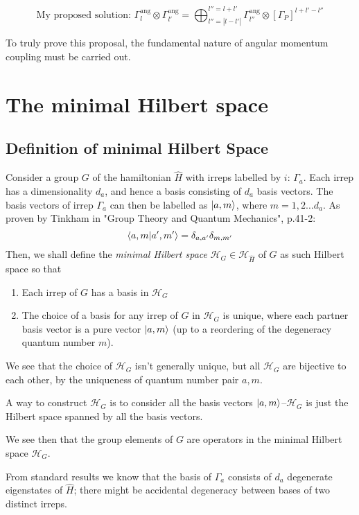 \documentclass[12pt]{article}
\begin{document}
	$$\text{My proposed solution: }\Gamma^\text{ang}_{l}\otimes \Gamma^\text{ang}_{l'} = \bigoplus_{l''=|l-l'|}^{l''=l+l'} \Gamma^\text{ang}_{l''} \otimes \left[\Gamma_P\right]^{l+l'-l''}$$
	
	To truly prove this proposal, the fundamental nature of angular momentum coupling must be carried out.
	
	\section{The minimal Hilbert space}
	
	\subsection{Definition of minimal Hilbert Space}
	
	Consider a group $G$ of the hamiltonian $\hat{H}$ with irreps labelled by $i$: $\Gamma_a$. Each irrep has a dimensionality $d_a$, and hence a basis consisting of $d_a$ basis vectors. The basis vectors of irrep $\Gamma_a$ can then be labelled as $\ket{a,m}$, where $m=1,2\dots d_a$. As proven by Tinkham in "Group Theory and Quantum Mechanics", p.41-2:
	$$\braket{a,m}{a',m'}=\delta_{a,a'}\delta_{m,m'}$$
	Then, we shall define the \textit{minimal Hilbert space} $\mathcal{H}_G\in\mathcal{H}_{\hat{H}}$ of $G$ as such Hilbert space so that
	\begin{enumerate}
	\item Each irrep of $G$ has a basis in $\mathcal{H}_G$
	\item The choice of a basis for any irrep of $G$ in $\mathcal{H}_G$ is unique, where each partner basis vector is a pure vector $\ket{a,m}$ (up to a reordering of the degeneracy quantum number $m$).
	\end{enumerate}
	We see that the choice of $\mathcal{H}_G$ isn't generally unique, but all $\mathcal{H}_G$ are bijective to each other, by the uniqueness of quantum number pair $a,m$.
	
	A way to construct $\mathcal{H}_G$ is to consider all the basis vectors $\ket{a,m}$--$\mathcal{H}_G$ is just the Hilbert space spanned by all the basis vectors.
	
	We see then that the group elements of $G$ are operators in the minimal Hilbert space $\mathcal{H}_G$.
	
	From standard results we know that the basis of $\Gamma_a$ consists of $d_a$ degenerate eigenstates of $\hat{H}$; there might be accidental degeneracy between bases of two distinct irreps.
	
\end{document}
